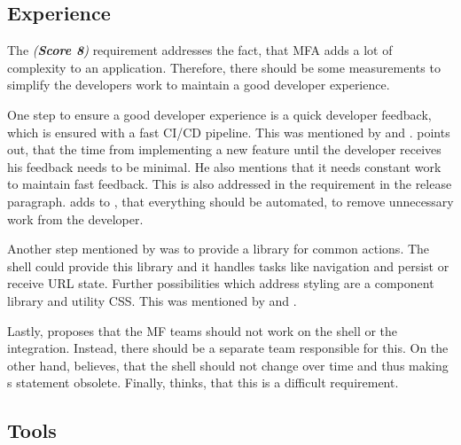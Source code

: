 \subsection{Experience}\label{cha:requirement_detail_developer_experience}

The \textit{ (\textbf{Score 8})} requirement addresses the fact, that \ac{MFA} adds a lot of complexity to an application.
Therefore, there should be some measurements to simplify the developers work to maintain a good developer experience.

One step to ensure a good developer experience is a quick developer feedback, which is ensured with a fast \ac{CI/CD} pipeline.
This was mentioned by \textciteMezzalira{} and \textcite{Grijzen.2019}.
\citeauthorMezzalira{} points out, that the time from implementing a new feature until the developer receives his feedback needs to be minimal.
He also mentions that it needs constant work to maintain fast feedback.
This is also addressed in the \textit{} requirement in the release paragraph.
\citeauthor{Grijzen.2019} adds to \citeauthorMezzalira{}, that everything should be automated, to remove unnecessary work from the developer.

Another step mentioned by \textcite{Grijzen.2019} was to provide a library for common actions.
The shell could provide this library and it handles tasks like navigation and persist or receive \ac{URL} state.
Further possibilities which address styling are a component library and utility \ac{CSS}.
This was mentioned by \textciteRehm{} and \textciteHuber{}.

Lastly, \textciteSteyer{} proposes that the \ac{MF} teams should not work on the shell or the integration.
Instead, there should be a separate team responsible for this.
On the other hand, \textcite{Laug.2018} believes, that the shell should not change over time and thus making \citeauthorSteyer{}s statement obsolete.
Finally, \textciteMezzalira{} thinks, that this is a difficult requirement.




\subsection{Tools}\label{cha:requirement_detail_developer_tools}

